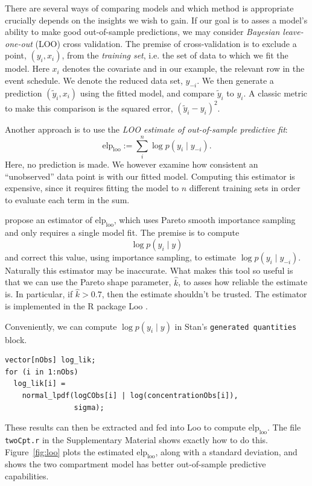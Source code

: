 There are several ways of comparing models and which method is appropriate crucially depends on the insights we wish to gain.
If our goal is to asses a model's ability to make good out-of-sample predictions, we may consider \textit{Bayesian leave-one-out} (LOO) cross validation.
The premise of cross-validation is to exclude a point, $(y_i, x_i)$, from the \textit{training set}, i.e. the set of data to which we fit the model.
Here $x_i$ denotes the covariate and in our example, the relevant row in the event schedule.
We denote the reduced data set, $y_{-i}$.
We then generate a prediction $(\tilde y_i, x_i)$ using the fitted model, and compare $\tilde y_i$ to $y_i$.
A classic metric to make this comparison is the squared error, $(\tilde y_i - y_i)^2$.

Another approach is to use the \textit{LOO estimate of out-of-sample predictive fit}:
\begin{equation*}
  \mathrm{elp}_\mathrm{loo} := \sum_{i}^n \log p(y_i \mid y_{-i}).
\end{equation*}
%
Here, no prediction is made.
We however examine how consistent an ``unobserved'' data point is with our fitted model.
Computing this estimator is expensive, since it requires fitting the model to $n$ different training sets in order to evaluate each term in the sum.

\citet{Vehtari:2016} propose an estimator of $\mathrm{elp}_\mathrm{loo}$, which uses Pareto smooth importance sampling and only requires a single model fit.
The premise is to compute
\begin{equation*}
  \log p(y_i \mid y)
\end{equation*}
and correct this value, using importance sampling, to estimate $\log p(y_i \mid y_{-i})$.
Naturally this estimator may be inaccurate.
What makes this tool so useful is that we can use the Pareto shape parameter, $\hat k$, to asses how reliable the estimate is.
In particular, if $\hat k > 0.7$, then the estimate shouldn't be trusted.
The estimator is implemented in the R package Loo \cite{author:0000}.

Conveniently, we can compute $\log p(y_i \mid y)$ in Stan's \texttt{generated quantities} block.
\begin{lstlisting}
vector[nObs] log_lik;
for (i in 1:nObs)
  log_lik[i] =  
    normal_lpdf(logCObs[i] | log(concentrationObs[i]), 
                sigma);
\end{lstlisting}
These results can then be extracted and fed into Loo to compute $\mathrm{elp}_\mathrm{loo}$.
The file \texttt{twoCpt.r} in the Supplementary Material shows exactly how to do this.
Figure~\ref{fig:loo} plots the estimated $\mathrm{elp}_\mathrm{loo}$, along with a standard deviation, and shows the two compartment model has better out-of-sample predictive capabilities.

